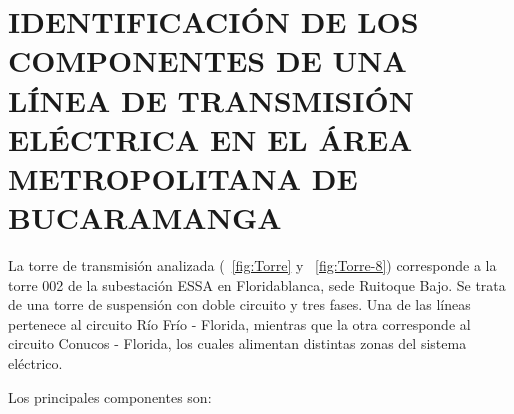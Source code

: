 \section{IDENTIFICACIÓN DE LOS COMPONENTES DE UNA LÍNEA DE TRANSMISIÓN ELÉCTRICA EN EL ÁREA METROPOLITANA DE BUCARAMANGA}

La torre de transmisión analizada (\figurename~\ref{fig:Torre} y \figurename~\ref{fig:Torre-8}) corresponde a la torre 002 de la subestación ESSA en Floridablanca, sede Ruitoque Bajo. Se trata de una torre de suspensión con doble circuito y tres fases. Una de las líneas pertenece al circuito Río Frío - Florida, mientras que la otra corresponde al circuito Conucos - Florida, los cuales alimentan distintas zonas del sistema eléctrico.

Los principales componentes son:

